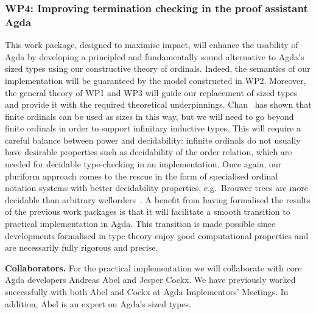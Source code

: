 \documentclass[a4paper,11pt]{article}
\let\oldcite\cite
\renewcommand*\cite[1]{{\protect\NoHyper\oldcite{#1}\protect\endNoHyper}}
\renewcommand{\paragraph}[1]{\textbf{#1.}}
\begin{document}
\subsubsection*{WP4: Improving termination checking in the proof assistant Agda}
\vspace*{-0.25em}
This work package, designed to maximise impact, will enhance the usability of Agda by developing a principled and fundamentally sound alternative to Agda's sized types using our constructive theory of ordinals.
%
Indeed, the semantics of our implementation will be guaranteed by the model constructed in WP2. Moreover, the general theory of WP1 and WP3 will guide our replacement of sized types and provide it with the required theoretical underpinnings.
%
Chan~\cite{Chan2022} has shown that finite ordinals can be used as sizes in this way, but we will need to go beyond finite ordinals in order to support infinitary inductive types.
%
This will require a careful balance between power and decidability: infinite ordinals do not usually have desirable properties such as decidability of the order relation, which are needed for decidable type-checking in an implementation.
%
Once again, our pluriform approach comes to the rescue in the form of specialised ordinal notation systems with better decidability properties, e.g.\ Brouwer trees are more decidable than arbitrary wellorders~\cite{ordTCS}.
%
A benefit from having formalised the results of the previous work packages is that it will facilitate a smooth transition to practical implementation in Agda. This transition is made possible since developments formalised in type theory enjoy good computational properties and are necessarily fully rigorous and precise.


\paragraph{Collaborators}
For the practical implementation we will collaborate with core Agda developers Andreas Abel and Jesper Cockx.
%
We have previously worked successfully with both Abel and Cockx at Agda Implementors' Meetings. In addition, Abel is an expert on Agda's sized types.
\end{document}
